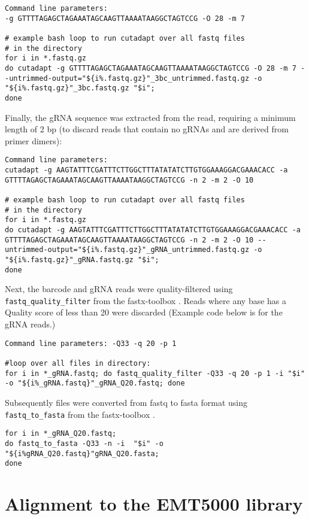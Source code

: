 \begin{lstlisting}
Command line parameters:
-g GTTTTAGAGCTAGAAATAGCAAGTTAAAATAAGGCTAGTCCG -O 28 -m 7

# example bash loop to run cutadapt over all fastq files
# in the directory
for i in *.fastq.gz
do cutadapt -g GTTTTAGAGCTAGAAATAGCAAGTTAAAATAAGGCTAGTCCG -O 28 -m 7 --untrimmed-output="${i%.fastq.gz}"_3bc_untrimmed.fastq.gz -o "${i%.fastq.gz}"_3bc.fastq.gz "$i";
done
\end{lstlisting}

Finally, the gRNA sequence was extracted from the read, requiring a minimum length of 2 bp (to discard reads that contain no gRNAs and are derived from primer dimers):

\begin{lstlisting}
Command line parameters:
cutadapt -g AAGTATTTCGATTTCTTGGCTTTATATATCTTGTGGAAAGGACGAAACACC -a GTTTTAGAGCTAGAAATAGCAAGTTAAAATAAGGCTAGTCCG -n 2 -m 2 -O 10

# example bash loop to run cutadapt over all fastq files 
# in the directory
for i in *.fastq.gz
do cutadapt -g AAGTATTTCGATTTCTTGGCTTTATATATCTTGTGGAAAGGACGAAACACC -a GTTTTAGAGCTAGAAATAGCAAGTTAAAATAAGGCTAGTCCG -n 2 -m 2 -O 10 --untrimmed-output="${i%.fastq.gz}"_gRNA_untrimmed.fastq.gz -o "${i%.fastq.gz}"_gRNA.fastq.gz "$i";
done

\end{lstlisting}

Next, the barcode and gRNA reads were quality-filtered using \verb|fastq_quality_filter| from the fastx-toolbox \cite{Hannon:Online}. Reads where any base has a Quality score of less than 20 were discarded (Example code below is for the gRNA reads.) 

\begin{lstlisting}
Command line parameters: -Q33 -q 20 -p 1 

#loop over all files in directory:
for i in *_gRNA.fastq; do fastq_quality_filter -Q33 -q 20 -p 1 -i "$i" -o "${i%_gRNA.fastq}"_gRNA_Q20.fastq; done
\end{lstlisting}

Subsequently files were converted from fastq to fasta format using \verb|fastq_to_fasta| from the fastx-toolbox \cite{Hannon:Online}. 

\begin{lstlisting}
for i in *_gRNA_Q20.fastq;
do fastq_to_fasta -Q33 -n -i  "$i" -o "${i%gRNA_Q20.fastq}"gRNA_Q20.fasta;
done
\end{lstlisting}

\section{Alignment to the EMT5000 library}

